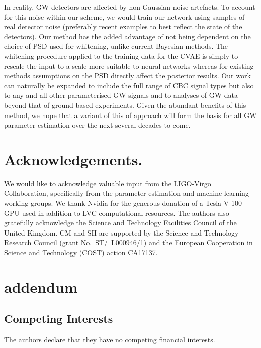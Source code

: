 \documentclass[%
showpacs,
 amsmath,amssymb,
 aps,
 twocolumn,
 prl,
 reprint,
floatfix,
]{revtex4-1}
\begin{document}
%
%
In reality, \ac{GW} detectors are affected by non-Gaussian noise artefacts. To
account for this noise within our scheme, we would train our network using
samples of real detector noise (preferably recent examples to best reflect the
state of the detectors). Our method has the added advantage of not being
dependent on the choice of \ac{PSD} used for whitening, unlike current Bayesian
methods. The whitening procedure applied to the training data for the \ac{CVAE}
is simply to rescale the input to a scale more suitable to neural networks
whereas for existing methods assumptions on the \ac{PSD} directly affect the
posterior results. Our work can naturally be expanded to include the full range
of \ac{CBC} signal types but also to any and all other parameterised \ac{GW}
signals and to analyses of \ac{GW} data beyond that of ground based
experiments. Given the abundant benefits of this method, we hope that a variant
of this of approach will form the basis for all \ac{GW} parameter estimation
over the next several decades to come.

%
%
\section{Acknowledgements.}
%
We would like to acknowledge valuable input from the LIGO-Virgo Collaboration,
specifically from the parameter estimation and machine-learning working groups.
We thank Nvidia for the generous donation of a Tesla V-100 GPU used in addition
to \ac{LVC} computational resources. The authors also gratefully
acknowledge the Science and Technology Facilities Council of the United
Kingdom. CM and SH are supported by the Science and Technology Research Council
(grant No.~ST/~L000946/1) and the European Cooperation in Science and
Technology (COST) action CA17137.


\section{addendum}
 \subsection{Competing Interests} 
    The authors declare that they have no competing financial interests.
\end{document}
